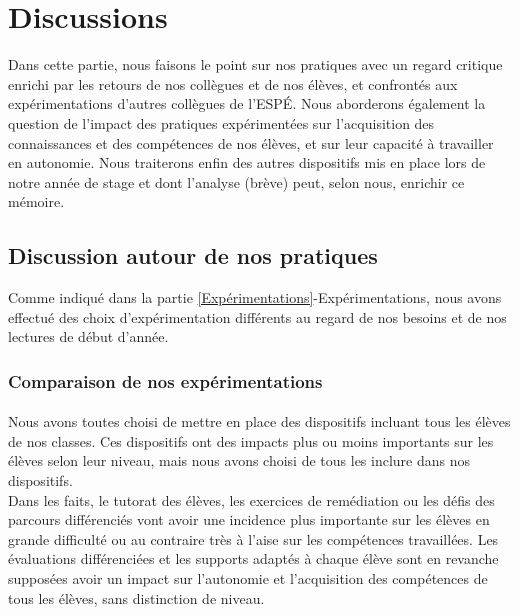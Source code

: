 \section{Discussions}
Dans cette partie, nous faisons le point sur nos pratiques avec un regard critique enrichi par les retours de nos collègues et de nos élèves, et confrontés aux expérimentations d'autres collègues de l'ESPÉ. Nous aborderons également la question de l'impact des pratiques expérimentées sur l'acquisition des connaissances et des compétences de nos élèves, et sur leur capacité à travailler en autonomie. Nous traiterons enfin des autres dispositifs mis en place lors de notre année de stage et dont l'analyse (brève) peut, selon nous, enrichir ce mémoire.
\subsection{Discussion autour de nos pratiques}
Comme indiqué dans la partie \ref{Expérimentations}-Expérimentations, nous avons effectué des choix d'expérimentation différents au regard de nos besoins et de nos lectures de début d'année.\\

\subsubsection{Comparaison de nos expérimentations}
\paragraph*{}Nous avons toutes choisi de mettre en place des dispositifs incluant tous les élèves de nos classes. Ces dispositifs ont des impacts plus ou moins importants sur les élèves selon leur niveau, mais nous avons choisi de tous les inclure dans nos dispositifs.\\
Dans les faits, le tutorat des élèves, les exercices de remédiation ou les défis des parcours différenciés vont avoir une incidence plus importante sur les élèves en grande difficulté ou au contraire très à l'aise sur les compétences travaillées. Les évaluations différenciées et les supports adaptés à chaque élève sont en revanche supposées avoir un impact sur l'autonomie et l'acquisition des compétences de tous les élèves, sans distinction de niveau.\\
